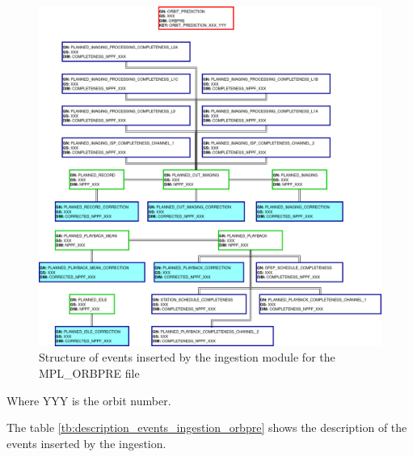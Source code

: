 \begin{figure}[H]
  \begin{center}
	\centering\includegraphics[width=150mm]{../fig/structure_ingestion_orbpre.png}
	\caption{Structure of events inserted by the ingestion module for the MPL\_ORBPRE file}
	\label{fg:structure_ingestion_orbpre}
  \end{center}
\end{figure}

Where YYY is the orbit number.

The table \ref{tb:description_events_ingestion_orbpre} shows the description of the events inserted by the ingestion.

